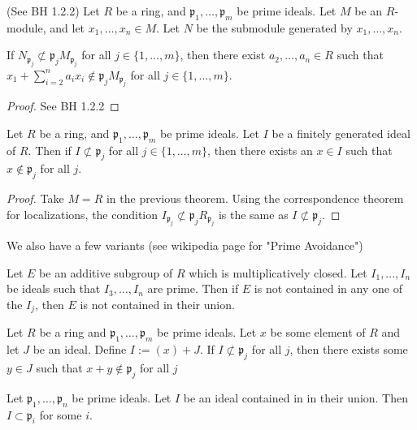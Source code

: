 \begin{lemma}
    \label{lem:prime_avoidance}
    (See BH 1.2.2)
    Let \(R\) be a ring, and \(\mathfrak{p}_{1}, \ldots, \mathfrak{p}_{m}\)
    be prime ideals.
    Let \(M\) be an \(R\)-module, and let \(x_{1}, \ldots, x_{n} \in M\).
    Let \(N\) be the submodule generated by \(x_{1}, \ldots, x_{n}\).

    If \(N_{\mathfrak{p}_{j}} \not\subset \mathfrak{p}_{j}M_{\mathfrak{p}_{j}}\) for
    all \(j \in \{1, \ldots, m\}\), then there exist
    \(a_{2}, \ldots, a_{n} \in R\) such that
    \(x_{1} + \sum_{i=2}^{n} a_{i}x_{i} \not\in \mathfrak{p}_{j} M_{\mathfrak{p}_{j}} \)
    for all \(j \in \{1, \ldots, m\}\).
\end{lemma}

\begin{proof}
    See BH 1.2.2
\end{proof}

\begin{corollary}
    \label{cor:prime_avoidance_ring}
    Let \(R\) be a ring, and \(\mathfrak{p}_{1}, \ldots, \mathfrak{p}_{m}\)
    be prime ideals. 
    Let \(I\) be a finitely generated ideal of \(R\).
    Then if \(I \not\subset \mathfrak{p}_{j}\) for all
    \(j \in \{1, \ldots, m\}\),
    then there exists an \(x \in I\)
    such that \(x \not\in \mathfrak{p}_{j}\) for all \(j\).
\end{corollary}

\begin{proof}
    Take \(M = R\) in the previous theorem.
    Using the correspondence theorem for localizations, 
    the condition \(I_{\mathfrak{p}_{j}} \not\subset \mathfrak{p}_{j}R_{\mathfrak{p}_{j}}\)
    is the same as \(I \not\subset \mathfrak{p}_{j}\).
\end{proof}

We also have a few variants (see wikipedia page for "Prime Avoidance")

\begin{lemma}
    Let \(E\) be an additive subgroup of \(R\) which is multiplicatively closed.
    Let \(I_{1}, \ldots, I_{n}\) be ideals such that \(I_{3}, \ldots, I_{n}\) are prime.
    Then if \(E\) is not contained in any one of the \(I_{j}\), then \(E\) is not
    contained in their union.
\end{lemma}

\begin{lemma}
    Let \(R\) be a ring and \(\mathfrak{p}_{1}, \ldots, \mathfrak{p}_{m}\)
    be prime ideals.
    Let \(x\) be some element of \(R\) and let \(J\) be an ideal.
    Define \(I := (x) + J\).
    If \(I \not\subset \mathfrak{p}_{j}\) for all \(j\),
    then
    there exists some \(y \in J\) such that
    \(x + y \not\in \mathfrak{p}_{j}\) for all \(j\)
\end{lemma}
\begin{lemma}
    Let \(\mathfrak{p}_{1}, \ldots, \mathfrak{p}_{n}\) be prime ideals.
    Let \(I\) be an ideal contained in in their union.
    Then \(I \subset \mathfrak{p}_{i}\) for some \(i\).
\end{lemma}

